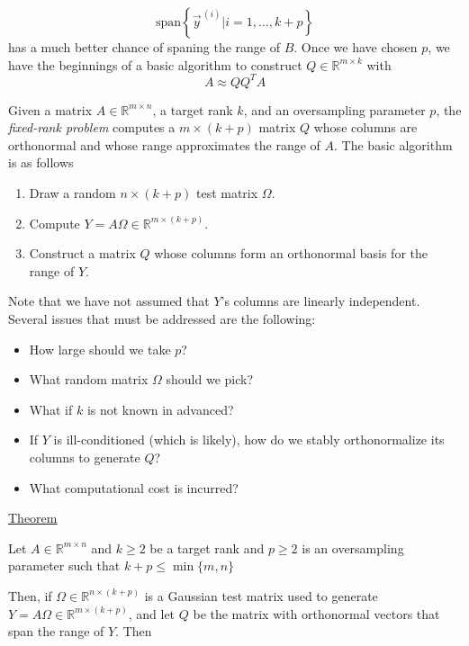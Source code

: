 \begin{equation*}
    \text{span} \left\{ \vec{y}^{\,(i)} \Big\vert i=1,\ldots, k+p\right\}
\end{equation*}
has a much better chance of spaning the range of $B$. Once we have chosen $p$, we have the beginnings of a basic algorithm to construct $Q\in \mathbb{R}^{m\times k}$ with
\begin{equation*}
    A \approx QQ^TA
\end{equation*}

Given a matrix $A \in \mathbb{R}^{m\times n}$, a target rank $k$, and an oversampling parameter $p$, the \emph{fixed-rank problem} computes a $m\times (k+p)$ matrix $Q$  whose columns are orthonormal and whose range approximates the range of $A$. The basic algorithm is as follows

\begin{enumerate}[1)]
    \item Draw a random $n \times (k+p)$ test matrix $\Omega$.
    \item Compute $Y = A \Omega \in \mathbb{R}^{m\times (k+p)}$.
    \item Construct a matrix $Q$ whose columns form an orthonormal basis for the range of $Y$.
\end{enumerate}

Note that we have not assumed that $Y$'s columns are linearly independent. Several issues that must be addressed are the following:
\begin{itemize}
    \item How large should we take $p$?
    \item What random matrix $\Omega$ should we pick?
    \item What if $k$ is not known in advanced?
    \item If $Y$ is ill-conditioned (which is likely), how do we stably orthonormalize its columns to generate $Q$?
    \item What computational cost is incurred?
\end{itemize}



\underline{Theorem}

Let $A\in\mathbb{R}^{m\times n}$ and $k\geq2$ be a target rank and $p\geq2$ is an oversampling parameter such that $k+p\leq \min \{ m, n \}$

Then, if $\Omega\in\mathbb{R}^{n\times (k+p)}$ is a Gaussian test matrix used to generate $Y=A\Omega \in \mathbb{R}^{m \times (k+p)}$, and let $Q$ be the matrix with orthonormal vectors that span the range of $Y$. Then

